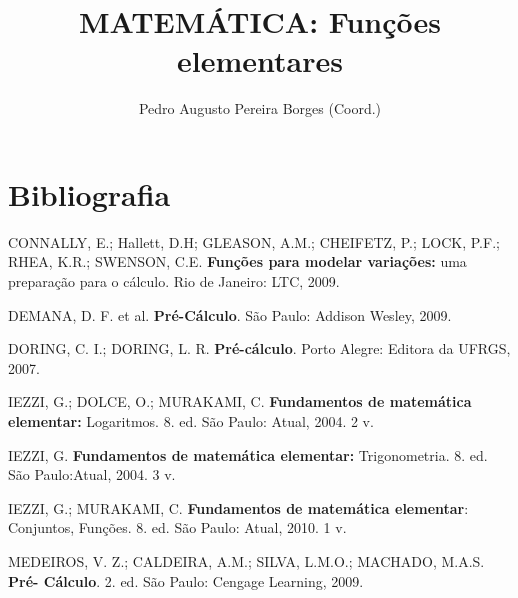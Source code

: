 \documentclass[12pt]{book}
\title{MATEMÁTICA: Funções elementares}
\author{Pedro Augusto Pereira Borges (Coord.)}
\date{\now}
\theoremstyle{definition}
\begin{document}
\begin{titlepage}
    
\end{titlepage}



\tableofcontents
\clearpage























\chapter*{Bibliografia}

\noindent CONNALLY, E.; Hallett, D.H; GLEASON, A.M.; CHEIFETZ, P.; LOCK, P.F.;
RHEA, K.R.; SWENSON, C.E. \textbf{Funções para modelar variações:} uma
preparação para o cálculo. Rio de Janeiro: LTC, 2009.

\noindent DEMANA, D. F. et al. \textbf{Pré-Cálculo}. São Paulo: Addison Wesley, 2009.

\noindent DORING, C. I.; DORING, L. R. \textbf{Pré-cálculo}. Porto Alegre: Editora da UFRGS, 2007.

\noindent IEZZI, G.; DOLCE, O.; MURAKAMI, C. \textbf{Fundamentos de matemática elementar:}
Logaritmos. 8. ed. São Paulo: Atual, 2004. 2 v.

\noindent IEZZI, G. \textbf{Fundamentos de matemática elementar:} Trigonometria. 8. ed. São
Paulo:Atual, 2004. 3 v.

\noindent IEZZI, G.; MURAKAMI, C. \textbf{Fundamentos de matemática elementar}: Conjuntos,
Funções. 8. ed. São Paulo: Atual, 2010. 1 v.

\noindent MEDEIROS, V. Z.; CALDEIRA, A.M.; SILVA, L.M.O.; MACHADO, M.A.S. \textbf{Pré-
Cálculo}. 2. ed. São Paulo: Cengage Learning, 2009.
\end{document}
